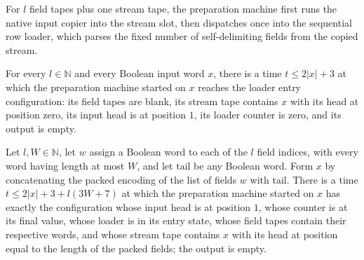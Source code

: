 \begin{definition}
\label{Complexity.clPrepareTM}
\leanok
{}
For $l$ field tapes plus one stream tape, the preparation machine first runs the native input copier into the stream slot, then dispatches once into the sequential row loader, which parses the fixed number of self-delimiting fields from the copied stream.
\end{definition}

\begin{lemma}
\label{Complexity.clPrepare_start}
\leanok
{}
For every $l\in\mathbb{N}$ and every Boolean input word $x$, there is a time $t\le
2|x|+3$ at which the preparation machine started on $x$ reaches the loader entry
configuration: its field tapes are blank, its stream tape contains $x$ with its head at
position zero, its input head is at position $1$, its loader counter is zero, and its
output is empty.
\end{lemma}

\begin{lemma}
\label{Complexity.clPrepare_complete}
\leanok
{}
Let $l,W\in\mathbb{N}$, let $w$ assign a Boolean word to each of the $l$ field indices,
with every word having length at most $W$, and let $\mathrm{tail}$ be any Boolean word.
Form $x$ by concatenating the packed encoding of the list of fields $w$ with
$\mathrm{tail}$. There is a time $t\le 2|x|+3+l(3W+7)$ at which the preparation machine
started on $x$ has exactly the configuration whose input head is at position $1$, whose
counter is at its final value, whose loader is in its entry state, whose field tapes
contain their respective words, and whose stream tape contains $x$ with its head at
position equal to the length of the packed fields; the output is empty.
\end{lemma}

